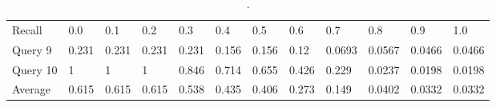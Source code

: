 \begin{table}[H]
\centering
\begin{tabular}{ l l l l l l l l l l l l }
Recall & 0.0 & 0.1 & 0.2 & 0.3 & 0.4 & 0.5 & 0.6 & 0.7 & 0.8 & 0.9 & 1.0 \\
\cline{2-12}
Query 9 & 0.231 & 0.231 & 0.231 & 0.231 & 0.156 & 0.156 & 0.12 & 0.0693 & 0.0567 & 0.0466 & 0.0466 \\
\cline{2-12}
Query 10 & 1 & 1 & 1 & 0.846 & 0.714 & 0.655 & 0.426 & 0.229 & 0.0237 & 0.0198 & 0.0198 \\
\cline{2-12}
Average & 0.615 & 0.615 & 0.615 & 0.538 & 0.435 & 0.406 & 0.273 & 0.149 & 0.0402 & 0.0332 & 0.0332 \\
\cline{2-12}
\end{tabular}
\caption{.}
\label{tab:ipr68}
\end{table}
